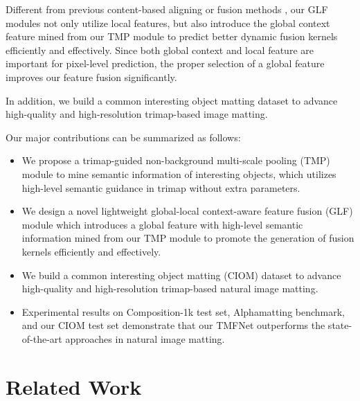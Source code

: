 \documentclass[10pt,twocolumn,letterpaper]{article}
\begin{document}
Different from previous content-based aligning or fusion methods \cite{indexnet,a2u,carafe}, our GLF modules not only utilize local features, but also introduce the global context feature mined from our TMP module to predict better dynamic fusion kernels efficiently and effectively. Since both global context and local feature are important for pixel-level prediction, the proper selection of a global feature improves our feature fusion significantly.


In addition, we build a common interesting object matting  dataset to advance high-quality and high-resolution trimap-based image matting.


Our major contributions can be summarized as follows:
\begin{itemize}
\item We propose a trimap-guided non-background multi-scale pooling (TMP) module to mine semantic information of interesting objects, which utilizes high-level semantic guidance in trimap without extra parameters.

\item We design a novel lightweight global-local context-aware feature fusion (GLF) module which introduces a global feature with high-level semantic information mined from our TMP module to promote the generation of fusion kernels efficiently and effectively.


\item  We build a common interesting object matting (CIOM) dataset to advance high-quality and high-resolution trimap-based natural image matting.
\item Experimental results on Composition-1k \cite{deepmatting} test set, Alphamatting \cite{alphamatting} benchmark, and our CIOM test set demonstrate that our TMFNet outperforms the state-of-the-art approaches in natural image matting.
\end{itemize}


\section{Related Work}
\end{document}
